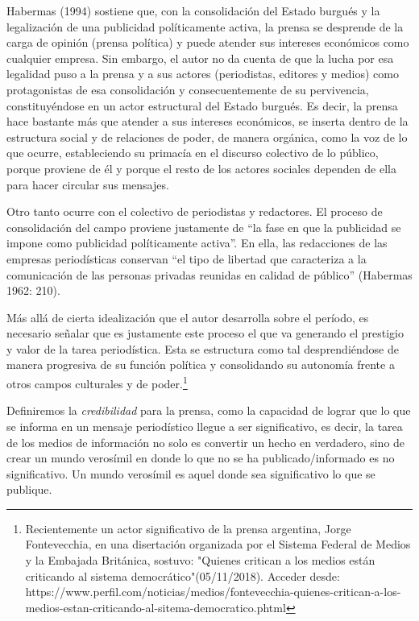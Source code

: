 Habermas (1994) sostiene que, con la consolidación del Estado burgués y la legalización de una publicidad políticamente activa, la prensa se desprende de la carga de opinión (prensa política) y puede atender sus intereses económicos como cualquier empresa. Sin embargo, el autor no da cuenta de que la lucha por esa legalidad puso a la prensa y a sus actores (periodistas, editores y medios) como protagonistas de esa consolidación y consecuentemente de su pervivencia, constituyéndose en un actor estructural del Estado burgués. Es decir, la prensa hace bastante más que atender a sus intereses económicos, se inserta dentro de la estructura social y de relaciones de poder, de manera orgánica, como la voz de lo que ocurre, estableciendo su primacía en el discurso colectivo de lo público, porque proviene de él y porque el resto de los actores sociales dependen de ella para hacer circular sus mensajes.

Otro tanto ocurre con el colectivo de periodistas y redactores. El proceso de consolidación del campo proviene justamente de ``la fase en que la publicidad se impone como publicidad políticamente activa''. En ella, las redacciones de las empresas periodísticas conservan ``el tipo de libertad que caracteriza a la comunicación de las personas privadas reunidas en calidad de público'' (Habermas 1962: 210).

Más allá de cierta idealización que el autor desarrolla sobre el período, es necesario señalar que es justamente este proceso el que va generando el prestigio y valor de la tarea periodística. Esta se estructura como tal desprendiéndose de manera progresiva de su función política y consolidando su autonomía frente a otros campos culturales y de poder.\footnote{Recientemente un actor significativo de la prensa argentina, Jorge Fontevecchia, en una disertación organizada por el Sistema Federal de Medios y la Embajada Británica, sostuvo: "Quienes critican a los medios están criticando al sistema democrático"(05/11/2018). Acceder desde: https://www.perfil.com/noticias/medios/fontevecchia-quienes-critican-a-los-medios-estan-criticando-al-sitema-democratico.phtml}

Definiremos la \emph{credibilidad} para la prensa, como la capacidad de lograr que lo que se informa en un mensaje periodístico llegue a ser significativo, es decir, la tarea de los medios de información no solo es convertir un hecho en verdadero, sino de crear un mundo verosímil en donde lo que no se ha publicado/informado es no significativo. Un mundo verosímil es aquel donde sea significativo lo que se publique.

